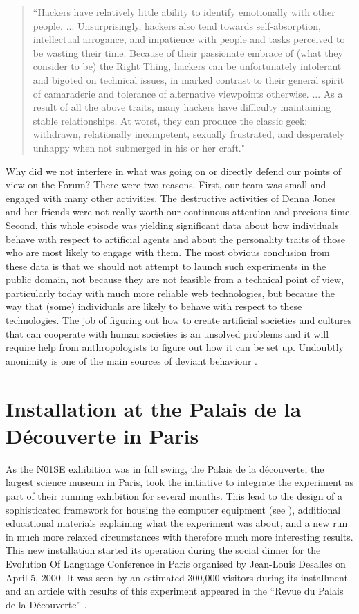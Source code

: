 \begin{quotation}
``Hackers have relatively little ability to identify emotionally with other people. ... Unsurprisingly, hackers also tend towards self-absorption, intellectual arrogance, and impatience with people and tasks perceived to be wasting their time. Because of their passionate embrace of (what they consider to be) the Right Thing, hackers can be unfortunately intolerant and bigoted on technical issues, in marked contrast to their general spirit of camaraderie and tolerance of alternative viewpoints otherwise. ... As a result of all the above traits, many hackers have difficulty maintaining stable relationships. At worst, they can produce the classic geek: withdrawn, relationally incompetent, sexually frustrated, and desperately unhappy when not submerged in his or her craft."
\end{quotation}

Why did we not interfere in what was going on or directly defend our points of view on the Forum? There were two reasons. First, our team was small and engaged with many other activities. The destructive activities of Denna Jones and her friends were not really worth our continuous attention and precious time. Second, this whole episode was yielding significant data about how individuals behave with respect to artificial agents and about the personality traits of those who are most likely to engage with them. The most obvious conclusion from these data is that we should not attempt to launch such experiments in 
the public domain, not because they are not feasible from a technical point of view, particularly today with much more 
reliable web technologies, but because the way that (some) individuals are likely 
to behave with respect to these technologies. The job of figuring out how to create artificial societies and cultures 
that can cooperate with human societies is an unsolved problems and it will require help from anthropologists to figure out 
how it can be set up. Undoubtly anonimity is one of the main sources of deviant behaviour \citep{Knight:1999}. 

\section{Installation at the Palais de la D\'{e}couverte in Paris}

As the N01SE exhibition was in full swing, the Palais de la d\'{e}couverte, the largest science museum in Paris, 
took the initiative to integrate the experiment as part of their running exhibition for several months. This lead 
to the design of a sophisticated framework for housing the computer equipment (see ), 
additional educational materials explaining
what the experiment was about, and a new run in much more relaxed circumstances with therefore much more 
interesting results. This new installation started its operation during the social 
dinner for the Evolution Of Language Conference in Paris organised by Jean-Louis Desalles
on April 5, 2000. It was seen by an estimated 300,000 visitors
during its installment and an article with results of this experiment
appeared in the ``Revue du Palais de la D\'{e}couverte'' \citep{Steels:2000kaplan}. 

